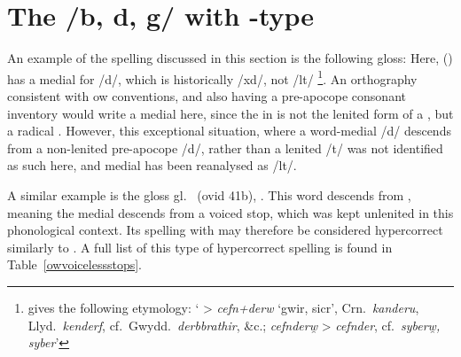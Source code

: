 
\section{The /b, d, g/ with -type}
\label{bdgwithptc}
An example of the spelling discussed in this section is the following gloss:
Here,   () has a medial  for /d/, which is historically /\gls{x}d/, not /\gls{l}t/%
\footnote{\Textcite[s.v.\ ]{bevan_geiriadur_2014} gives the following etymology: `\textwelsh{ > \textit{cefn+derw} ‘gwir, sicr’, Crn.\ \textit{kanderu}, Llyd.\ \textit{kenderf}, cf.\ Gwydd.\ \textit{derbbrathir}, \&c.; \textit{cefnderw̯} > \textit{cefnder}, cf.\ \textit{syberw̯, syber}}'}. 
An orthography consistent with \gls{ow} conventions, and also having a pre-apocope consonant inventory would write a medial  here, since the  in  is not the lenited form of a , but a radical . However, this exceptional situation, where a word-medial /d/ descends from a non-lenited pre-apocope /d/, rather than a lenited /t/  was not identified as such here, and medial  has been reanalysed as /\gls{l}t/.

A similar example is the gloss  gl.\  (\acrshort{ovid} 41b), . This word descends from , meaning the medial  descends from a voiced stop, which was kept unlenited in this phonological context. Its spelling with  may therefore be considered hypercorrect similarly to . A full list of this type of hypercorrect spelling is found in Table~\ref{owvoicelessstops}. 

